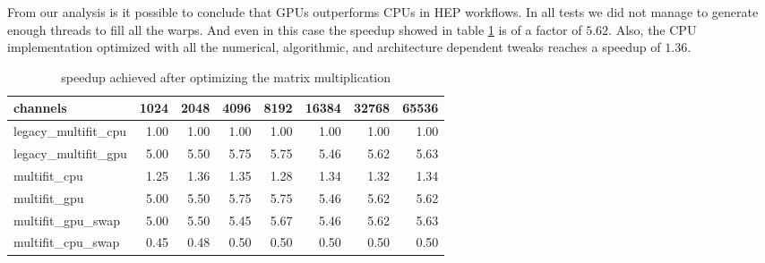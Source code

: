From our analysis is it possible to conclude that GPUs outperforms CPUs in HEP workflows. In all tests we did not manage to generate enough threads to fill all the warps. And even in this case the speedup showed in table \ref{tab:speedup} is of a factor of $5.62$. Also, the CPU implementation optimized with all the numerical, algorithmic, and architecture dependent tweaks reaches a speedup of $1.36$.  
\begin{table}[h]
  \caption{speedup achieved after optimizing the matrix multiplication}
  \label{tab:speedup}
  \begin{tabular}{lrrrrrrr}
    \toprule
    channels &  1024  &  2048  &  4096  &  8192  &  16384 &  32768 &  65536 \\
    \midrule
    legacy\_multifit\_cpu &   1.00 &   1.00 &   1.00 &   1.00 &   1.00 &   1.00 &   1.00 \\
    legacy\_multifit\_gpu &   5.00 &   5.50 &   5.75 &   5.75 &   5.46 &   5.62 &   5.63 \\
    multifit\_cpu        &   1.25 &   1.36 &   1.35 &   1.28 &   1.34 &   1.32 &   1.34 \\
    multifit\_gpu        &   5.00 &   5.50 &   5.75 &   5.75 &   5.46 &   5.62 &   5.62 \\
    multifit\_gpu\_swap   &   5.00 &   5.50 &   5.45 &   5.67 &   5.46 &   5.62 &   5.63 \\
    multifit\_cpu\_swap   &   0.45 &   0.48 &   0.50 &   0.50 &   0.50 &   0.50 &   0.50 \\
    \bottomrule
    \end{tabular}
\end{table}
